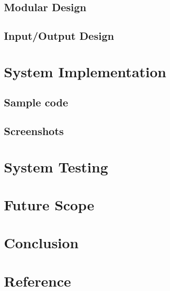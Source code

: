 \documentclass{article}
\begin{document}
\subsection{Modular Design}
\vspace{1em}
\subsection{Input/Output Design}
\vspace{1em}


\newpage

\section{System Implementation}
\vspace{1em}

\subsection{Sample code}
\vspace{1em}
\subsection{Screenshots}
\vspace{1em}


\newpage


\section{System Testing}
\vspace{1em}


\newpage

\section{Future Scope}
\vspace{1em}

\newpage

\section{Conclusion}
\vspace{1em}

\newpage


\section{Reference}
\vspace{1em}


\newpage
\end{document}
